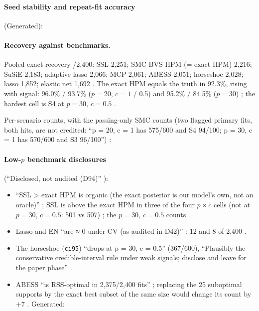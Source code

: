 \paragraph{Seed stability and repeat-fit accuracy} (Generated):


\paragraph{Recovery against benchmarks.}  Pooled exact recovery /2,400: SSL 2,251; SMC-BVS HPM (= exact HPM)
2,216; SuSiE 2,183; adaptive lasso 2,066; MCP 2,061; ABESS 2,051; horseshoe 2,028; lasso 1,852; elastic net 1,692
. The exact HPM equals the truth in 92.3\%, rising with signal: 96.0\% / 93.7\% ($p=20$,
$c=1$ / 0.5) and 95.2\% / 84.5\% ($p=30$) ; the hardest
cell is S4 at $p=30$, $c=0.5$ .

Per-scenario counts, with the passing-only SMC counts (two flagged primary fits, both hits, are not credited:
``p = 20, c = 1 has 575/600 and S4 94/100; p = 30, c = 1 has 570/600 and S3 96/100'')
:


\paragraph{Low-$p$ benchmark disclosures} (``Disclosed, not audited (D94)'' ):
\begin{itemize}
\item ``SSL > exact HPM is organic (the exact posterior is our model's own, not an oracle)'' ; SSL is
above the exact HPM in three of the four $p\times c$ cells (not at $p=30$, $c=0.5$: 501 vs 507)
; the $p=30$, $c=0.5$ counts .
\item Lasso and EN ``are ≈ 0 under CV (as audited in D42)'' : 12 and 8 of 2,400
.
\item The horseshoe (\texttt{ci95}) ``drops at p = 30, c = 0.5'' (367/600), ``Plausibly the conservative credible-interval rule
under weak signals; disclose and leave for the paper phase'' .
\item ABESS ``is RSS-optimal in 2,375/2,400 fits'' ; replacing the 25 suboptimal supports by the exact
best subset of the same size would change its count by $+7$ .
Generated:
\end{itemize}


